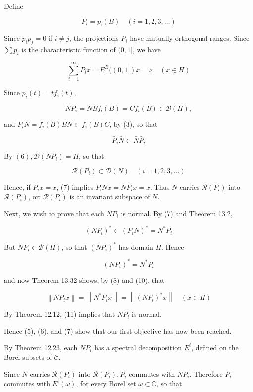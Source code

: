 \documentclass[10pt]{article}
\begin{document}
Define

$$
P_{i}=p_{i}(B) \quad(i=1,2,3, \ldots)
$$

Since $p_{i} p_{j}=0$ if $i \neq j$, the projections $P_{i}$ have mutually orthogonal ranges. Since $\sum p_{i}$ is the characteristic function of $(0,1]$, we have

$$
\sum_{i=1}^{\infty} P_{i} x=E^{B}((0,1]) x=x \quad(x \in H)
$$

Since $p_{i}(t)=t f_{i}(t)$,

$$
N P_{i}=N B f_{i}(B)=C f_{i}(B) \in \mathscr{B}(H),
$$

and $P_{i} N=f_{i}(B) B N \subset f_{i}(B) C$, by (3), so that

$$
\bar{P}_{i} \bar{N} \subset \bar{N} \bar{P}_{i}
$$

By $(6), \mathscr{D}\left(N P_{i}\right)=H$, so that

$$
\mathscr{R}\left(P_{i}\right) \subset \mathscr{D}(N) \quad(i=1,2,3, \ldots)
$$

Hence, if $P_{i} x=x$, (7) implies $P_{i} N x=N P_{i} x=x$. Thus $N$ carries $\mathscr{R}\left(P_{i}\right)$ into $\mathscr{R}\left(P_{i}\right)$, or: $\mathscr{R}\left(P_{i}\right)$ is an invariant subspace of $N$.

Next, we wish to prove that each $N P_{i}$ is normal. By (7) and Theorem 13.2,

$$
\left(N P_{i}\right)^{*} \subset\left(P_{i} N\right)^{*}=N^{*} P_{i}
$$

But $N P_{i} \in \mathscr{B}(H)$, so that $\left(N P_{i}\right)^{*}$ has domain $H$. Hence

$$
\left(N P_{i}\right)^{*}=N^{*} P_{i}
$$

and now Theorem 13.32 shows, by (8) and (10), that

$$
\left\|N P_{i} x\right\|=\left\|N^{*} P_{i} x\right\|=\left\|\left(N P_{i}\right)^{*} x\right\| \quad(x \in H)
$$

By Theorem 12.12, (11) implies that $N P_{i}$ is normal.

Hence (5), (6), and (7) show that our first objective has now been reached.

By Theorem 12.23, each $N P_{i}$ has a spectral decomposition $E^{i}$, defined on the Borel subsets of $\mathscr{C}$.

Since $N$ carries $\mathscr{R}\left(P_{i}\right)$ into $\mathscr{R}\left(P_{i}\right), P_{i}$ commutes with $N P_{i}$. Therefore $P_{i}$ commutes with $E^{i}(\omega)$, for every Borel set $\omega \subset \mathbb{C}$, so that
\end{document}
